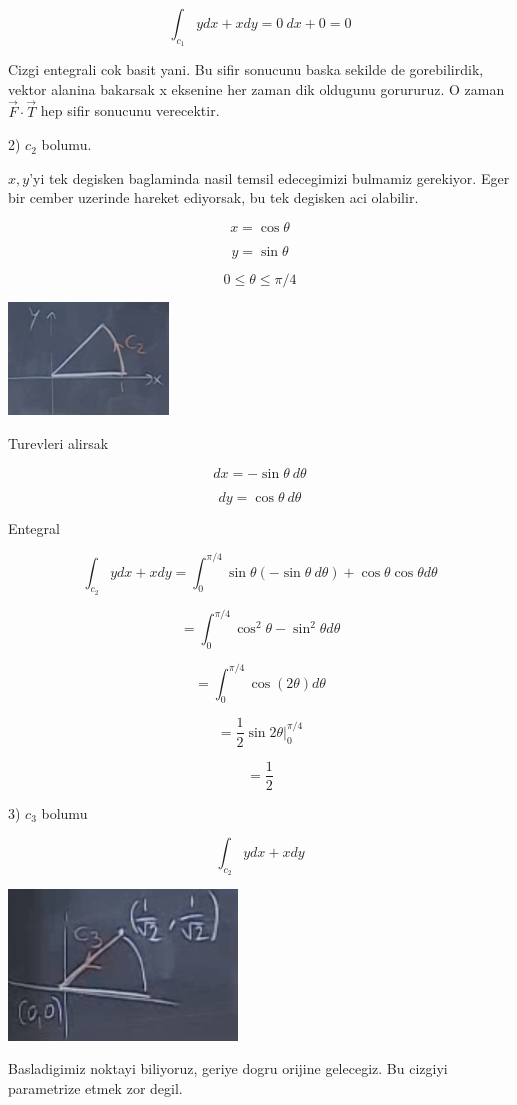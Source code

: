 \documentclass[12pt,fleqn]{article}\usepackage{../common}
\begin{document}
\[ \int_{c_1} y dx + x dy = 0 \ dx + 0 = 0\]

Cizgi entegrali cok basit yani. Bu sifir sonucunu baska sekilde de
gorebilirdik, vektor alanina bakarsak x eksenine her zaman dik oldugunu
gorururuz. O zaman $\vec{F}\cdot \vec{T}$ hep sifir sonucunu verecektir. 

2) $c_2$ bolumu. 

$x,y$'yi tek degisken baglaminda nasil temsil edecegimizi bulmamiz
gerekiyor. Eger bir cember uzerinde hareket ediyorsak, bu tek degisken aci
olabilir. 

\[ x = \cos\theta \]

\[ y = \sin\theta \]

\[ 0 \le \theta \le \pi / 4 \]

\includegraphics[height=3cm]{20_3.png}

Turevleri alirsak

\[ dx = -\sin\theta \ d\theta\]

\[ dy = \cos\theta \ d\theta \]

Entegral

\[ \int_{c_2} y dx + x dy = 
\int_0^{\pi/4} \sin\theta (-\sin\theta \ d\theta)  + 
\cos\theta \cos\theta d\theta
\]

\[ = \int_0^{\pi/4} \cos^2\theta - \sin^2\theta d\theta \]

\[ = \int_0^{\pi/4} \cos(2\theta) d\theta \]

\[ = \frac{1}{2}\sin 2\theta \bigg|_0^{\pi/4} \]

\[ = \frac{1}{2} \]

3) $c_3$ bolumu

\[ \int_{c_2} y dx + x dy \]

\includegraphics[height=4cm]{20_4.png}

Basladigimiz noktayi biliyoruz, geriye dogru orijine gelecegiz. Bu cizgiyi
parametrize etmek zor degil. 
\end{document}
